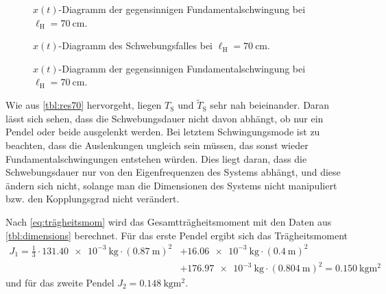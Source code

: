 \documentclass[12pt,a4paper]{scrartcl}
\newcommand{\lh}{\ell_{\mathrm{H}}}
\begin{document}
\begin{figure}[H]
	\caption{\(x(t)\)-Diagramm der gegensinnigen Fundamentalschwingung bei \(\lh = \qty{70}{\centi\meter}\).}
	\label{fig:geg70}
\end{figure}

\begin{figure}[H]
	\caption{\(x(t)\)-Diagramm des Schwebungsfalles bei \(\lh = \qty{70}{\centi\meter}\).}
	\label{fig:schweb}
\end{figure}

\begin{figure}[H]
	\caption{\(x(t)\)-Diagramm der gegensinnigen Fundamentalschwingung bei \(\lh = \qty{70}{\centi\meter}\).}
	\label{fig:ungl70}
\end{figure}

Wie aus \autoref{tbl:res70} hervorgeht, liegen \(T_{\text{S}}\) und \(\tilde{T}_{\text{S}}\) sehr nah beieinander. Daran lässt sich sehen, dass die Schwebungsdauer nicht davon abhängt, ob nur ein Pendel oder beide ausgelenkt werden. Bei letztem Schwingungsmode ist zu beachten, dass die Auslenkungen ungleich sein müssen, das sonst wieder Fundamentalschwingungen entstehen würden. Dies liegt daran, dass die Schwebungsdauer nur von den Eigenfrequenzen des Systems abhängt, und diese ändern sich nicht, solange man die Dimensionen des Systems nicht manipuliert bzw. den Kopplungsgrad nicht verändert.

%
%
%

Nach \autoref{eq:trägheitsmom} wird das Gesamtträgheitsmoment mit den Daten aus \autoref{tbl:dimensions} berechnet. Für das erste Pendel ergibt sich das Trägheitsmoment
\begin{equation*}
	\begin{split}
		J_1 = \frac{1}{3} \cdot \qty{131,40e-3}{\kilogram} \cdot (\qty{0,87}{\meter})^2 &+ \qty{16,06e-3}{\kilogram} \cdot (\qty{0,4}{\meter})^2
		\\&+ \qty{176,97e-3}{\kilogram} \cdot (\qty{0,804}{\meter})^2 = \qty{0,150}{\kilogram\meter\squared}
	\end{split}
\end{equation*}
und für das zweite Pendel \(J_2 = \qty{0,148}{\kilogram\meter\squared}\).
\end{document}
